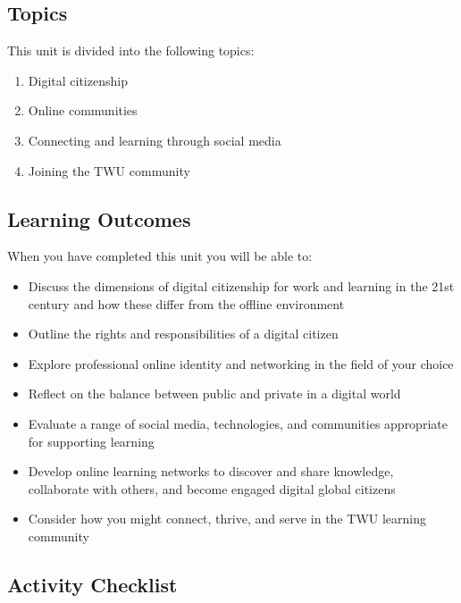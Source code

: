 \documentclass[
  letterpaper,
  DIV=11,
  numbers=noendperiod]{scrreprt}
\providecommand{\tightlist}{%
  \setlength{\itemsep}{0pt}\setlength{\parskip}{0pt}}\usepackage{longtable,booktabs,array}
\begin{document}
\subsection*{Topics}\label{topics-4}

This unit is divided into the following topics:

\begin{enumerate}
\def\labelenumi{\arabic{enumi}.}
\tightlist
\item
  Digital citizenship
\item
  Online communities
\item
  Connecting and learning through social media
\item
  Joining the TWU community
\end{enumerate}

\subsection*{Learning Outcomes}\label{learning-outcomes-3}

When you have completed this unit you will be able to:

\begin{itemize}
\tightlist
\item
  Discuss the dimensions of digital citizenship for work and learning in
  the 21st century and how these differ from the offline environment
\item
  Outline the rights and responsibilities of a digital citizen
\item
  Explore professional online identity and networking in the field of
  your choice
\item
  Reflect on the balance between public and private in a digital world
\item
  Evaluate a range of social media, technologies, and communities
  appropriate for supporting learning
\item
  Develop online learning networks to discover and share knowledge,
  collaborate with others, and become engaged digital global citizens
\item
  Consider how you might connect, thrive, and serve in the TWU learning
  community
\end{itemize}

\subsection*{Activity Checklist}\label{activity-checklist-4}
\end{document}
